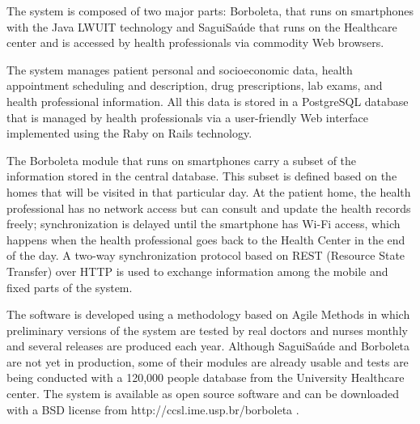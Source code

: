 \documentclass[12pt]{article}
\begin{document}
The system is composed of two major parts: Borboleta, that runs on smartphones with the Java LWUIT
technology and SaguiSaúde that runs on the Healthcare center and is accessed by health professionals
via commodity Web browsers.

The system manages patient personal and socioeconomic data, health appointment
scheduling and description, drug prescriptions, lab exams, and health professional
information. All this data is stored in a PostgreSQL database that is managed by health
professionals via a user-friendly Web interface implemented using the Raby on Rails technology.

The Borboleta module that runs on smartphones carry a subset of the information stored in the central database.
This subset is defined based on the homes that will be visited in that particular day. At the patient home,
the health professional has no network access but can consult and update the health records freely;
synchronization is delayed until the smartphone has Wi-Fi access, which happens when the health professional
goes back to the Health Center in the end of the day. A two-way synchronization protocol based on REST
(Resource State Transfer) over HTTP is used to exchange information among the mobile and fixed parts of the system.

The software is developed using a methodology based on Agile Methods in which preliminary versions of the system
are tested by real doctors and nurses monthly and several releases are produced each year. Although SaguiSaúde
and Borboleta are not yet in production, some of their modules are already usable and tests are being conducted
with a 120,000 people database from the University Healthcare center. The system is available as open source
software and can be downloaded with a BSD license from http://ccsl.ime.usp.br/borboleta .






\end{document}
